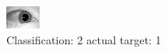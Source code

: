 \begin{figure}[h!]
\begin{center}
\includegraphics[width=0.60\columnwidth]{figures/ID1450_class_2_target_1.png}
\end{center}
\caption{ Classification: 2 actual target: 1}
\label{fig:ID1450_class_2_target_1}
\end{figure}
